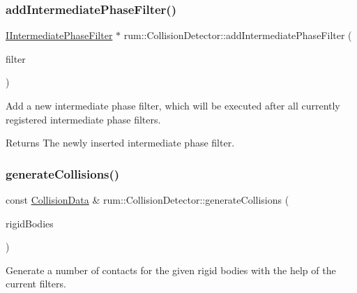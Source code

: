 \subsubsection{\texorpdfstring{add\+Intermediate\+Phase\+Filter()}{addIntermediatePhaseFilter()}}
{\footnotesize\ttfamily \mbox{\hyperlink{classrum_1_1_i_intermediate_phase_filter}{I\+Intermediate\+Phase\+Filter}} $\ast$ rum\+::\+Collision\+Detector\+::add\+Intermediate\+Phase\+Filter (\begin{DoxyParamCaption}\item[{\mbox{\hyperlink{classrum_1_1_collision_detector_aa1a7155543cdbe0265865b3e6f14b260}{Intermediate\+Phase\+Filter\+\_\+\+Ptr}}}]{filter }\end{DoxyParamCaption})}

Add a new intermediate phase filter, which will be executed after all currently registered intermediate phase filters. \begin{DoxyReturn}{Returns}
The newly inserted intermediate phase filter. 
\end{DoxyReturn}
\mbox{\label{classrum_1_1_collision_detector_aa8096b4bb5f7b6ebf1605202ef170734}} 
\subsubsection{\texorpdfstring{generate\+Collisions()}{generateCollisions()}}
{\footnotesize\ttfamily const \mbox{\hyperlink{classrum_1_1_collision_data}{Collision\+Data}} \& rum\+::\+Collision\+Detector\+::generate\+Collisions (\begin{DoxyParamCaption}\item[{const std\+::vector$<$ \mbox{\hyperlink{classrum_1_1_rigid_body}{Rigid\+Body}} $\ast$$>$ \&}]{rigid\+Bodies }\end{DoxyParamCaption})}

Generate a number of contacts for the given rigid bodies with the help of the current filters. \mbox{\label{classrum_1_1_collision_detector_aa03aaf950039ff0cac3013c8b23ed8d6}} 
